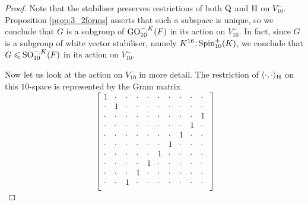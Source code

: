 \begin{proof}
	Note that the stabiliser preserves restrictions of both $\mathord{\mathrm{Q}}$ and $\mathrm{H}$ on $V_{10}^-$. Proposition
	\ref{prop:3_2forms} asserts that such a subspace is unique, so we conclude that $G$ is 
	a subgroup of $\mathrm{GO}_{10}^{-,K}(F)$ in its action on $V_{10}^-$. In fact, since $G$ is a 
	subgroup of white vector stabiliser, namely $K^{16}\mathord{{\;\!{:}\;\!}}\mathrm{Spin}_{10}^+(K)$, we conclude that 
	$G \leqslant \mathrm{SO}_{10}^{-,K}(F)$ in its action on $V_{10}^-$. 
	
	Now let us look at the action on $V_{10}^{-}$ in more detail. The restriction of 
	$\langle \cdot, \cdot \rangle_{\mathrm{H}}$ on
	this $10$-space is represented by the Gram matrix
	\begin{equation*}
		\begin{bmatrix}
			1 & \cdot & \cdot & \cdot & \cdot & \cdot & \cdot & \cdot & \cdot & \cdot \\
			\cdot & 1 & \cdot & \cdot & \cdot & \cdot & \cdot & \cdot & \cdot & \cdot \\
			\cdot & \cdot & \cdot & \cdot & \cdot & \cdot & \cdot & \cdot & \cdot & 1 \\
			\cdot & \cdot & \cdot & \cdot & \cdot & \cdot & \cdot & \cdot & 1 & \cdot \\
			\cdot & \cdot & \cdot & \cdot & \cdot & \cdot & \cdot & 1 & \cdot & \cdot \\
			\cdot & \cdot & \cdot & \cdot & \cdot & \cdot & 1 & \cdot & \cdot & \cdot \\
			\cdot & \cdot & \cdot & \cdot & \cdot & 1 & \cdot & \cdot & \cdot & \cdot \\
			\cdot & \cdot & \cdot & \cdot & 1 & \cdot & \cdot & \cdot & \cdot & \cdot \\
			\cdot & \cdot & \cdot & 1 & \cdot & \cdot & \cdot & \cdot & \cdot & \cdot \\
			\cdot & \cdot & 1 & \cdot & \cdot & \cdot & \cdot & \cdot & \cdot & \cdot \\
		\end{bmatrix}
	\end{equation*}

\end{proof}
